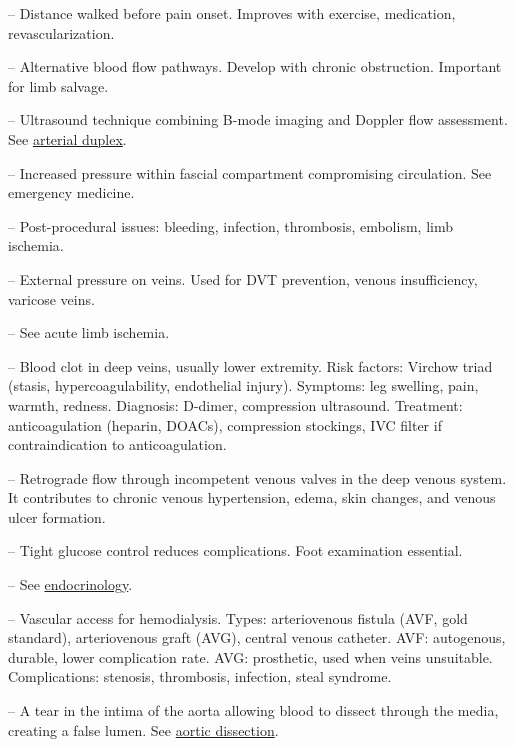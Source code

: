 -- Distance walked before pain onset. Improves with exercise, medication, revascularization.

-- Alternative blood flow pathways. Develop with chronic obstruction. Important for limb salvage.

-- Ultrasound technique combining B-mode imaging and Doppler flow assessment. See \hyperlink{Arterial Duplex}{arterial duplex}.

-- Increased pressure within fascial compartment compromising circulation. See emergency medicine.

-- Post-procedural issues: bleeding, infection, thrombosis, embolism, limb ischemia.


-- External pressure on veins. Used for DVT prevention, venous insufficiency, varicose veins.

-- See acute limb ischemia.

-- Blood clot in deep veins, usually lower extremity. Risk factors: Virchow triad (stasis, hypercoagulability, endothelial injury). Symptoms: leg swelling, pain, warmth, redness. Diagnosis: D-dimer, compression ultrasound. Treatment: anticoagulation (heparin, DOACs), compression stockings, IVC filter if contraindication to anticoagulation.

-- Retrograde flow through incompetent venous valves in the deep venous system. It contributes to chronic venous hypertension, edema, skin changes, and venous ulcer formation.

-- Tight glucose control reduces complications. Foot examination essential.

-- See \hyperlink{Endocrinology}{endocrinology}.

-- Vascular access for hemodialysis. Types: arteriovenous fistula (AVF, gold standard), arteriovenous graft (AVG), central venous catheter. AVF: autogenous, durable, lower complication rate. AVG: prosthetic, used when veins unsuitable. Complications: stenosis, thrombosis, infection, steal syndrome.

-- A tear in the intima of the aorta allowing blood to dissect through the media, creating a false lumen. See \hyperlink{Aortic Dissection}{aortic dissection}.

